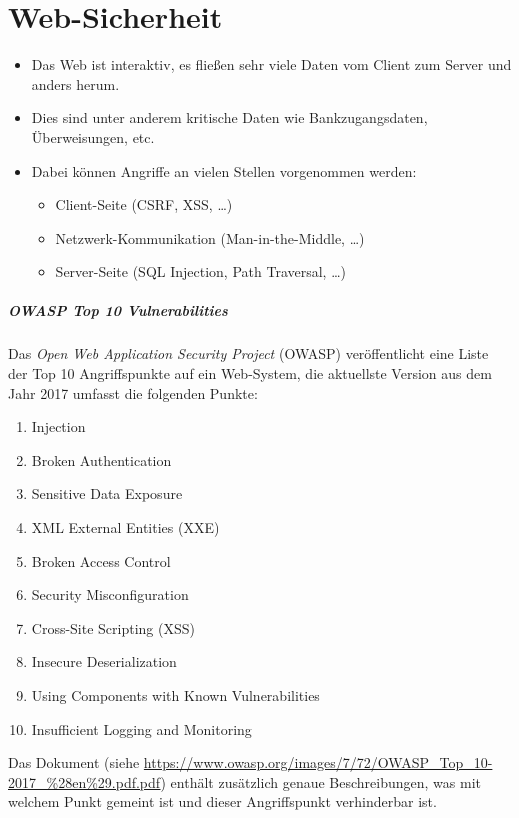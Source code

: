 \documentclass[a4paper, 11pt, accentcolor = tud3b]{tudreport}
\newcommand{\HREF}[1]{\href{#1}{#1}}
\begin{document}
    \chapter{Web-Sicherheit}
        \begin{itemize}
        	\item Das Web ist interaktiv, es fließen sehr viele Daten vom Client zum Server und anders herum.
        	\item Dies sind unter anderem kritische Daten wie Bankzugangsdaten, Überweisungen, etc.
        	\item Dabei können Angriffe an vielen Stellen vorgenommen werden:
	        	\begin{itemize}
	        		\item Client-Seite (CSRF, XSS, \dots)
	        		\item Netzwerk-Kommunikation (Man-in-the-Middle, \dots)
	        		\item Server-Seite (SQL Injection, Path Traversal, \dots)
	        	\end{itemize}
        \end{itemize}
    
	    \paragraph{OWASP Top 10 Vulnerabilities}
		    Das \textit{Open Web Application Security Project} (OWASP) veröffentlicht eine Liste der Top 10 Angriffspunkte auf ein Web-System, die aktuellste Version aus dem Jahr 2017 umfasst die folgenden Punkte:
		    \begin{enumerate}
		    	\item Injection
		    	\item Broken Authentication
		    	\item Sensitive Data Exposure
		    	\item XML External Entities (XXE)
		    	\item Broken Access Control
		    	\item Security Misconfiguration
		    	\item Cross-Site Scripting (XSS)
		    	\item Insecure Deserialization
		    	\item Using Components with Known Vulnerabilities
		    	\item Insufficient Logging and Monitoring
		    \end{enumerate}
		    Das Dokument (siehe \HREF{https://www.owasp.org/images/7/72/OWASP\_Top\_10-2017\_\%28en\%29.pdf.pdf}) enthält zusätzlich genaue Beschreibungen, was mit welchem Punkt gemeint ist und dieser Angriffspunkt verhinderbar ist.
\end{document}
